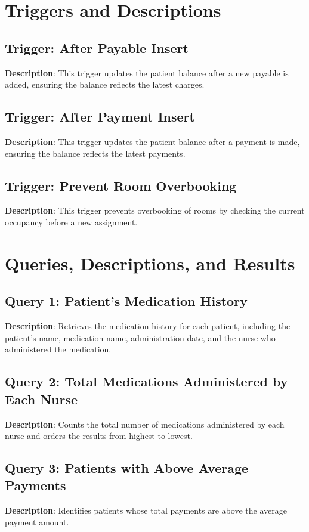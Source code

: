 \documentclass[a4paper,11pt]{article}
\theoremstyle{mytheor}
\begin{document}
\section{Triggers and Descriptions}
\subsection{Trigger: After Payable Insert}

\textbf{Description}: This trigger updates the patient balance after a new payable is added, ensuring the balance reflects the latest charges.

\subsection{Trigger: After Payment Insert}

\textbf{Description}: This trigger updates the patient balance after a payment is made, ensuring the balance reflects the latest payments.

\subsection{Trigger: Prevent Room Overbooking}

\textbf{Description}: This trigger prevents overbooking of rooms by checking the current occupancy before a new assignment.

\section{Queries, Descriptions, and Results}
\subsection{Query 1: Patient's Medication History}

\textbf{Description}: Retrieves the medication history for each patient, including the patient's name, medication name, administration date, and the nurse who administered the medication.

\subsection{Query 2: Total Medications Administered by Each Nurse}

\textbf{Description}: Counts the total number of medications administered by each nurse and orders the results from highest to lowest.

\subsection{Query 3: Patients with Above Average Payments}

\textbf{Description}: Identifies patients whose total payments are above the average payment amount.
\end{document}
